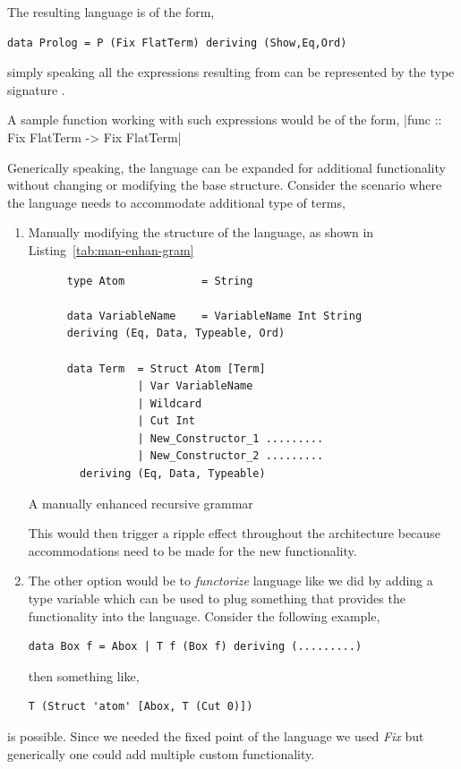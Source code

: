 \documentclass[thesis-solanki.tex]{subfiles}
\begin{document}
The resulting language is of the form,
\begin{verbatim}
data Prolog = P (Fix FlatTerm) deriving (Show,Eq,Ord)
\end{verbatim}
%
simply speaking all the expressions resulting from  can be represented  by the type signature .

A sample function working with such expressions would be of the form,
|func :: Fix FlatTerm -> Fix FlatTerm|


Generically speaking, the language can be expanded for additional functionality without changing or modifying the base structure. Consider
the scenario where the language needs to accommodate additional type of terms,

\begin{enumerate}
\item Manually modifying the structure of the language, as shown in Listing~\ref{tab:man-enhan-gram}
  \begin{code-list}
    \begin{verbatim}
      type Atom            = String

      data VariableName    = VariableName Int String
      deriving (Eq, Data, Typeable, Ord)

      data Term  = Struct Atom [Term]
                 | Var VariableName
                 | Wildcard
                 | Cut Int
                 | New_Constructor_1 .........
                 | New_Constructor_2 .........
        deriving (Eq, Data, Typeable)
    \end{verbatim}
    \caption{A manually enhanced recursive grammar}
    \label{tab:man-enhan-gram}
  \end{code-list}

This would then trigger a ripple effect throughout the architecture because accommodations need to be made for the new functionality.

\item The other option would be to \textit{functorize} language like we did by adding a type variable which can be used to plug something that provides the functionality into the language.
Consider the following example,

\begin{verbatim}
data Box f = Abox | T f (Box f) deriving (.........)
\end{verbatim}

then something like,
\begin{verbatim}
T (Struct 'atom' [Abox, T (Cut 0)])
\end{verbatim}
\end{enumerate}
is possible. Since we needed the fixed point of the language we used \textit{Fix} but generically one could add multiple custom
functionality.
\end{document}
